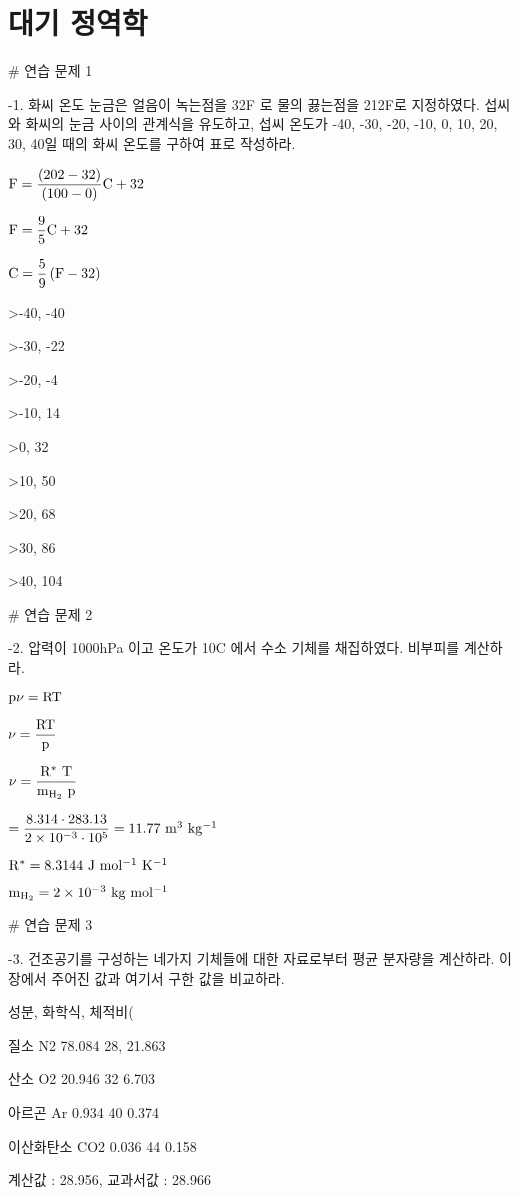 \section{대기 정역학 }

# 연습 문제 1


-1. 화씨 온도 눈금은 얼음이 녹는점을 32F 로 물의 끓는점을 212F로 지정하였다. 섭씨와 화씨의 눈금 사이의 관계식을 유도하고, 섭씨 온도가 -40, -30, -20,  -10, 0, 10, 20, 30, 40일 때의 화씨 온도를 구하여 표로 작성하라.

$ \rm F = \dfrac{(202-32)}{(100-0)} C + 32 $

$ \rm F = \dfrac{9}{5} C + 32$

$ \rm C = \dfrac{5}{9} \left( F - 32 \right)$

>-40,	-40

>-30,	-22

>-20,	-4

>-10,	14

>0,	32

>10,	50

>20,	68

>30,	86

>40,	104



# 연습 문제 2


-2. 압력이 1000hPa 이고 온도가 10C 에서 수소 기체를 채집하였다. 비부피를 계산하라.

$ \rm p  \nu = R T $

$ \rm \nu = \dfrac{R T}{p} $

$ \rm \nu = \dfrac{R^{*} ~T}{m_{H_{2}}~p} $

$ \rm = \dfrac{8.314 \cdot 283.13}{2 \times 10^{-3} \cdot 10^{5}} = 11.77 ~ m^{3}~kg^{-1} $

$ \rm R^{*} = 8.3144 ~J ~mol^{-1} ~K^{-1}$

$ \rm m_{H_{2}} = 2 \times 10^{-3} ~kg~mol^{-1} $




# 연습 문제 3


-3. 건조공기를 구성하는 네가지 기체들에 대한 자료로부터 평균 분자량을 계산하라. 이 장에서 주어진 값과 여기서 구한 값을 비교하라.

성분, 화학식, 체적비(%

질소	N2	78.084 28, 21.863

산소	O2	20.946	32 6.703

아르곤	Ar	0.934	40 0.374

이산화탄소	CO2	0.036	44 0.158

계산값 : 28.956, 교과서값 : 28.966


